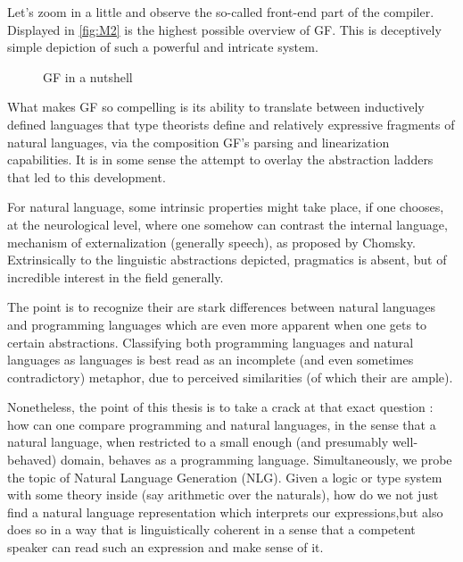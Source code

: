 Let's zoom in a little and observe the so-called front-end part of the compiler.
Displayed in \autoref{fig:M2} is the highest possible overview of GF. This is
deceptively simple depiction of such a powerful and intricate system.

\begin{figure}
\centering
{}
\caption{GF in a nutshell} \label{fig:M2}
\end{figure}

What makes GF so compelling is its ability to translate between
inductively defined languages that type theorists define and relatively
expressive fragments of natural languages, via the composition GF's parsing and
linearization capabilities. It is in some sense the attempt to overlay the
abstraction ladders that led to this development. 

For natural language, some intrinsic properties might take place, if one
chooses, at the neurological level, where one somehow can contrast the internal
language, mechanism of externalization (generally speech), as proposed by
Chomsky. Extrinsically to the linguistic abstractions depicted, pragmatics is
absent, but of incredible interest in the field generally.

The point is to recognize their are stark differences between natural languages
and programming languages which are even more apparent when one gets to certain
abstractions. Classifying both programming languages and natural languages as
languages is best read as an incomplete (and even sometimes contradictory)
metaphor, due to perceived similarities (of which their are ample).

Nonetheless, the point of this thesis is to take a crack at that exact question
: how can one compare programming and natural languages, in the sense that a
natural language, when restricted to a small enough (and presumably
well-behaved) domain, behaves as a programming language. Simultaneously, we
probe the topic of Natural Language Generation (NLG). Given a
logic or type system with some theory inside (say arithmetic over the naturals),
how do we not just find a natural language representation which interprets our
expressions,but also does so in a way that is linguistically coherent in a
sense that a competent speaker can read such an expression and make sense of it.

